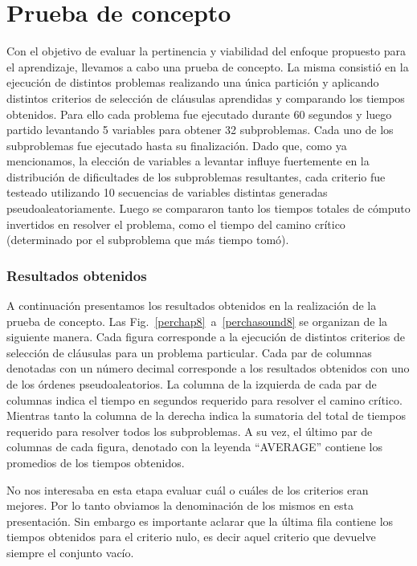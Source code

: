 

\section{Prueba de concepto}

Con el objetivo de evaluar la pertinencia y viabilidad del enfoque propuesto
para el aprendizaje, llevamos a cabo una prueba de concepto. La misma
consistió en la ejecución de distintos problemas realizando una única
partición y aplicando distintos criterios de selección de cláusulas aprendidas
y comparando los tiempos obtenidos. Para ello cada problema fue ejecutado
durante 60 segundos y luego partido levantando 5 variables para obtener 32
subproblemas. Cada uno de los subproblemas fue ejecutado hasta su
finalización. Dado que, como ya mencionamos, la elección de variables a
levantar influye fuertemente en la distribución de dificultades de los
subproblemas resultantes, cada criterio fue testeado utilizando 10 secuencias
de variables distintas generadas pseudoaleatoriamente. Luego se compararon
tanto los tiempos totales de cómputo invertidos en resolver el problema, como
el tiempo del camino crítico (determinado por el subproblema que más tiempo
tomó).


\subsubsection{Resultados obtenidos}

A continuación presentamos los resultados obtenidos en la realización de la
prueba de concepto. Las Fig.~\ref{perchap8}~a~\ref{perchasound8}  se organizan
de la siguiente manera. Cada figura corresponde a la ejecución de distintos
criterios de selección de cláusulas para un problema particular. Cada par de
columnas denotadas con un número decimal corresponde a los resultados
obtenidos con uno de los órdenes pseudoaleatorios. La columna de la izquierda
de cada par de columnas indica el tiempo en segundos requerido para resolver
el camino crítico. Mientras tanto la columna de la derecha indica la sumatoria
del total de tiempos requerido para resolver todos los subproblemas. A su vez,
el último par de columnas de cada figura, denotado con la leyenda ``AVERAGE''
contiene los promedios de los tiempos obtenidos.

No nos interesaba en esta etapa evaluar cuál o cuáles de los criterios eran
mejores. Por lo tanto obviamos la denominación de los mismos en esta
presentación. Sin embargo es importante aclarar que la última fila contiene
los tiempos obtenidos para el criterio nulo, es decir aquel criterio que
devuelve siempre el conjunto vacío.

